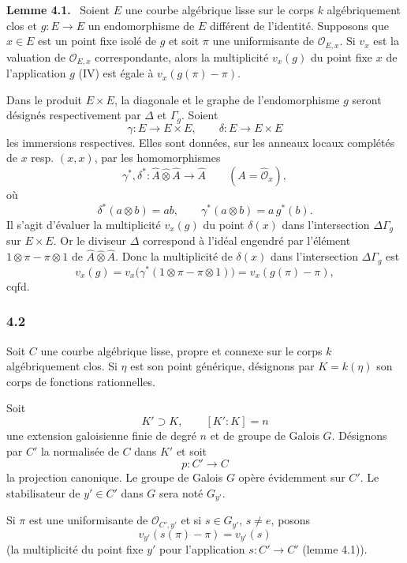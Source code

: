 \documentclass[11pt]{article}
\newenvironment{statement}[1]{\par\medskip\noindent\textbf{#1.}\ }{\par\medskip}
\begin{document}
\begin{statement}{Lemme 4.1}
Soient $E$ une courbe algébrique lisse sur le corps $k$ algébriquement clos et $g:E\to E$ un endomorphisme de $E$ différent de l'identité. Supposons que $x\in E$ est un point fixe isolé de $g$ et soit $\pi$ une uniformisante de $\mathcal O_{E,x}$. Si $v_x$ est la valuation de $\mathcal O_{E,x}$ correspondante, alors la multiplicité $v_x(g)$ du point fixe $x$ de l'application $g$ (IV) est égale à $v_x(g(\pi)-\pi)$.
\end{statement}


Dans le produit $E\times E$, la diagonale et le graphe de l'endomorphisme $g$ seront désignés respectivement par $\Delta$ et $\Gamma_g$. Soient
\[
\gamma:E\longrightarrow E\times E,\qquad
\delta:E\longrightarrow E\times E
\]
les immersions respectives. Elles sont données, sur les anneaux locaux complétés de $x$ resp. $(x,x)$, par les homomorphismes
\[
\gamma^*,\delta^*:\widehat A\widehat\otimes\widehat A\longrightarrow \widehat A
\qquad (A=\widehat{\mathcal O}_x),
\]
où
\[
\delta^*(a\otimes b)=ab,\qquad
\gamma^*(a\otimes b)=a\,g^*(b).
\]
Il s'agit d'évaluer la multiplicité $v_x(g)$ du point $\delta(x)$ dans l'intersection $\Delta\Gamma_g$ sur $E\times E$. Or le diviseur $\Delta$ correspond à l'idéal engendré par l'élément $1\otimes\pi-\pi\otimes1$ de $\widehat A\widehat\otimes\widehat A$. Donc la multiplicité de $\delta(x)$ dans l'intersection $\Delta\Gamma_g$ est
\[
v_x(g)=v_x\bigl(\gamma^*(1\otimes\pi-\pi\otimes1)\bigr)
      =v_x(g(\pi)-\pi),
\]
cqfd.

\subsubsection*{4.2}

Soit $C$ une courbe algébrique lisse, propre et connexe sur le corps $k$ algébriquement clos. Si $\eta$ est son point générique, désignons par $K=k(\eta)$ son corps de fonctions rationnelles.

Soit
\[
K'\supset K,\qquad [K':K]=n
\]
une extension galoisienne finie de degré $n$ et de groupe de Galois $G$. Désignons par $C'$ la normalisée de $C$ dans $K'$ et soit
\[
p:C'\longrightarrow C
\]
la projection canonique. Le groupe de Galois $G$ opère évidemment sur $C'$. Le stabilisateur de $y'\in C'$ dans $G$ sera noté $G_{y'}$.

Si $\pi$ est une uniformisante de $\mathcal O_{C',y'}$ et si $s\in G_{y'}$, $s\ne e$, posons
\[
v_{y'}(s(\pi)-\pi)=v_{y'}(s)
\tag{4.2.1}
\]
(la multiplicité du point fixe $y'$ pour l'application $s:C'\to C'$ (lemme 4.1)).
\end{document}
